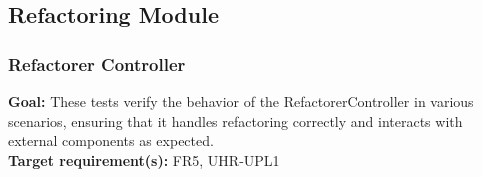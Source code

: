 \documentclass[12pt, titlepage]{article}
\begin{document}
\subsection{Refactoring Module}

\subsubsection{Refactorer Controller}

\textbf{Goal:} These tests verify the behavior of the RefactorerController in various scenarios, ensuring that it handles refactoring correctly and interacts with external components as expected.\\

\noindent \textbf{Target requirement(s):} FR5, UHR-UPL1~\cite{SRS} \\
\end{document}
